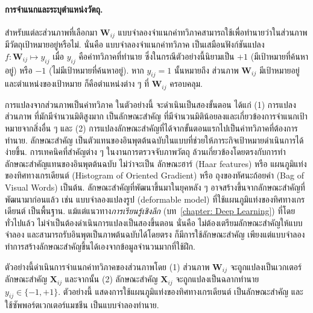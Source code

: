 \paragraph{การจำแนกและระบุตำแหน่งวัตถุ.}
สำหรับแต่ละส่วนภาพที่เลือกมา $\bm{W}_{ij}$
แบบจำลองจำแนกค่าทวิภาคสามารถใช้เพื่อทำนายว่าในส่วนภาพมีวัตถุเป้าหมายอยู่หรือไม่.
นั่นคือ แบบจำลองจำแนกค่าทวิภาค เป็นเสมือนฟังก์ชันแปลง $f: \bm{W}_{ij} \mapsto y_{ij}$
เมื่อ $y_{ij}$ คือค่าทวิภาคที่ทำนาย ซึ่งในกรณีตัวอย่างนี้นิยามเป็น $+1$ (มีเป้าหมายที่ค้นหาอยู่) หรือ $-1$ (ไม่มีเป้าหมายที่ค้นหาอยู่).
หาก $y_{ij} = 1$ นั้นหมายถึง ส่วนภาพ $\bm{W}_{ij}$ มีเป้าหมายอยู่ และตำแหน่งของเป้าหมาย ก็คือตำแหน่งต่าง ๆ ที่ $\bm{W}_{ij}$ ครอบคลุม.

การแปลงจากส่วนภาพเป็นค่าทวิภาค ในตัวอย่างนี้ จะดำเนินเป็นสองขั้นตอน ได้แก่ (1) การแปลงส่วนภาพ ที่มักมีจำนวนมิติสูงมาก เป็นลักษณะสำคัญ ที่มีจำนวนมิติน้อยลงและเกี่ยวข้องการจำแนกเป้าหมายจากสิ่งอื่น ๆ
และ (2) การแปลงลักษณะสำคัญที่ได้จากขั้นตอนแรกไปเป็นค่าทวิภาคที่ต้องการทำนาย.
ลักษณะสำคัญ เป็นตัวแทนของอินพุตต้นฉบับในแบบที่ช่วยให้ภาระกิจเป้าหมายดำเนินการได้ง่ายขึ้น.
การเทคนิคที่สำคัญต่าง ๆ ในงานการตรวจจับภาพวัตถุ
ล้วนเกี่ยวข้องโดยตรงกับการทำลักษณะสำคัญแทนของอินพุตต้นฉบับ
ไม่ว่าจะเป็น
ลักษณะฮาร์ (Haar features\cite{ViolaJones2001a})
หรือ
แผนภูมิแท่งของทิศทางเกรเดียนต์ (Histogram of Oriented Gradient)
หรือ
ถุงของทัศนะถ้อยคำ (Bag of Visual Words\cite{FeiFeiPerona2005a}) เป็นต้น.
ลักษณะสำคัญที่พัฒนาขึ้นมาในยุคหลัง ๆ อาจสร้างขึ้นจากลักษณะสำคัญที่พัฒนามาก่อนแล้ว 
เช่น แบบจำลองแปลงรูป (deformable model\cite{FelzenszwalbEtAl2008a}) ที่ใช้แผนภูมิแท่งของทิศทางเกรเดียนต์
เป็นพื้นฐาน.
แม้แต่แนวทาง\textit{การเรียนรู้เชิงลึก} (บท~\ref{chapter: Deep Learning})
ที่โดยทั่วไปแล้ว ไม่จำเป็นต้องดำเนินการแปลงเป็นสองขึ้นตอน นั่นคือ ไม่ต้องเตรียมลักษณะสำคัญให้แบบจำลอง และสามารถรับอินพุตเป็นภาพต้นฉบับได้โดยตรง
ก็มีการใช้ลักษณะสำคัญ เพียงแต่แบบจำลองทำการสร้างลักษณะสำคัญขึ้นได้เองจากข้อมูลจำนวนมากที่ใช้ฝึก.

ตัวอย่างนี้ดำเนินการจำแนกค่าทวิภาคของส่วนภาพโดย (1) ส่วนภาพ $\bm{W}_{ij}$ จะถูกแปลงเป็นเวกเตอร์ลักษณะสำคัญ $\bm{X}_{ij}$ 
และจากนั้น (2) ลักษณะสำคัญ $\bm{X}_{ij}$ จะถูกแปลงเป็นฉลากทำนาย $y_{ij} \in \{-1, +1\}$.
ตัวอย่างนี้ แสดงการใช้แผนภูมิแท่งของทิศทางเกรเดียนต์\cite{DalalTriggs2005a} เป็นลักษณะสำคัญ
และใช้ซัพพอร์ตเวกเตอร์แมชชีน\cite{CortesVapnik1995a} เป็นแบบจำลองทำนาย.

